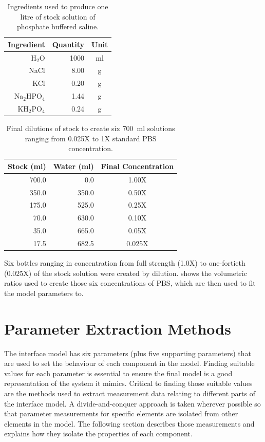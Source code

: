  \begin{table}
    \centering
    \begin{tabular}{r | r | c}
      Ingredient & Quantity & Unit \\
      \hline
      H$_2$O & 1000 & ml \\
      NaCl & 8.00  & g  \\
      KCl  & 0.20  & g  \\
      Na$_2$HPO$_4$ & 1.44 & g \\
      KH$_2$PO$_4$  & 0.24 & g \\
    \end{tabular}
    \caption{\label{tab:pt2-PBS-recipe}Ingredients used to produce one litre of stock solution of phosphate buffered saline.}
  \end{table}

  \begin{table}
    \centering
    \begin{tabular}{r | r | c}
      Stock (ml) & Water (ml) & Final Concentration \\
      \hline
      700.0 &   0.0 & 1.00X \\
      350.0 & 350.0 & 0.50X \\
      175.0 & 525.0 & 0.25X \\
       70.0 & 630.0 & 0.10X \\
       35.0 & 665.0 & 0.05X \\
       17.5 & 682.5 & 0.025X\\
    \end{tabular}
    \caption{\label{tab:pt2-PBS-concentration}Final dilutions of stock to create six \SI{700}{\milli\litre} solutions ranging from 0.025X to 1X standard PBS concentration.}
  \end{table}

  Six bottles ranging in concentration from full strength (1.0X) to one-fortieth (0.025X) of the stock solution were created by dilution.
   shows the volumetric ratios used to create those six concentrations of PBS, which are then used to fit the model parameters to.



\section{Parameter Extraction Methods}


  The interface model has six parameters (plus five supporting parameters) that are used to set the behaviour of each component in the model.
  Finding suitable values for each parameter is essential to ensure the final model is a good representation of the system it mimics.
  Critical to finding those suitable values are the methods used to extract measurement data relating to different parts of the interface model.
  A divide-and-conquer approach is taken wherever possible so that parameter measurements for specific elements are isolated from other elements in the model.
  The following section describes those measurements and explains how they isolate the properties of each component.

